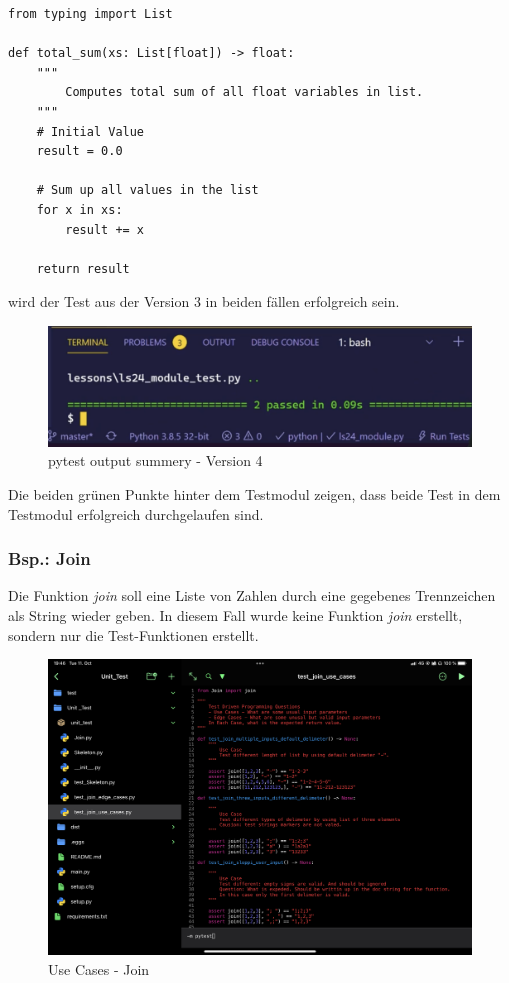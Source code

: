 \begin{lstlisting}[style=python, caption={Skelton-Function - Version 4; Skeleton.py}, captionpos=b]
from typing import List

def total_sum(xs: List[float]) -> float:
    """
        Computes total sum of all float variables in list.
    """
    # Initial Value
    result = 0.0
    
    # Sum up all values in the list
    for x in xs:
    	result += x
    
    return result
\end{lstlisting}

wird der Test aus der Version 3 in beiden fällen erfolgreich sein.
\begin{figure}[H]
	\centering
	\includegraphics[scale = 0.6]{attachment/chapter_2/Scc089}
	\caption{pytest output summery - Version 4}
\end{figure}

Die beiden grünen Punkte hinter dem Testmodul zeigen, dass beide Test in dem Testmodul erfolgreich durchgelaufen sind.	

\subsubsection{Bsp.: Join}

Die Funktion \textit{join} soll eine Liste von Zahlen durch eine gegebenes Trennzeichen als String wieder geben.
In diesem Fall wurde keine Funktion \textit{join} erstellt, sondern nur die Test-Funktionen erstellt.
\begin{figure}[H]
	\centering
	\includegraphics[scale = 0.6]{attachment/chapter_2/Scc090}
	\caption{Use Cases - Join}
\end{figure}

